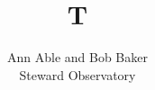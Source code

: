 \documentclass{emulateapj}
\begin{document}
\title{T}
\author{Ann Able and Bob Baker\\ Steward Observatory}
\maketitle
\end{document}
